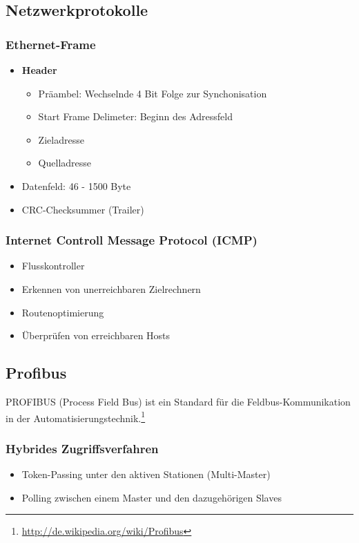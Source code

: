 \subsection{Netzwerkprotokolle}

\subsubsection{Ethernet-Frame}
\begin{itemize}
	\item \textbf{Header}
	\begin{itemize}
		\item Präambel: Wechselnde 4 Bit Folge zur Synchonisation
		\item Start Frame Delimeter: Beginn des Adressfeld
		\item Zieladresse
		\item Quelladresse
	\end{itemize}
	\item Datenfeld: 46 - 1500 Byte
	\item CRC-Checksummer (Trailer)
\end{itemize}

\subsubsection{Internet Controll Message Protocol (ICMP)}
\begin{itemize}
	\item Flusskontroller
	\item Erkennen von unerreichbaren Zielrechnern
	\item Routenoptimierung
	\item Überprüfen von erreichbaren Hosts
\end{itemize}


\subsection{Profibus}
PROFIBUS (Process Field Bus) ist ein Standard für die Feldbus-Kommunikation in der Automatisierungstechnik.\footnote{\url{http://de.wikipedia.org/wiki/Profibus}}

\subsubsection{Hybrides Zugriffsverfahren}
\begin{itemize}
	\item Token-Passing unter den aktiven Stationen (Multi-Master)
	\item Polling zwischen einem Master und den dazugehörigen Slaves
\end{itemize}


